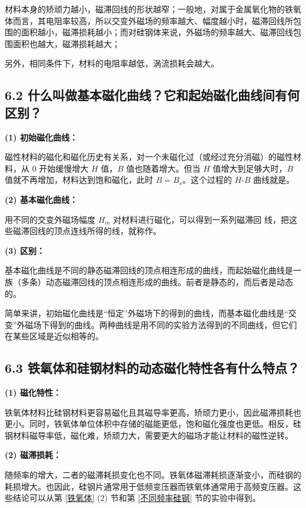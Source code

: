 \documentclass[UTF8]{article}
\theoremstyle{MyLineTheoremStyle} %
\theoremstyle{MyBlockTheoremStyle} %
\theoremstyle{MySubsubsectionStyle} %
\begin{document}
材料本身的矫顽力越小，磁滞回线的形状越窄；一般地，对属于金属氧化物的铁氧体而言，其电阻率较高，所以交变外磁场的频率越大、幅度越小时，磁滞回线所包围的面积越小，磁滞损耗越小；而对硅钢体来说，外磁场的频率越大、磁滞回线包围面积也越大，磁滞损耗越大；

另外，相同条件下，材料的电阻率越低，涡流损耗会越大。


\subsection*{6.2 什么叫做基本磁化曲线？它和起始磁化曲线间有何区别？}

\noindent\textbf{(1) 初始磁化曲线：}

磁性材料的磁化和磁化历史有关系，对一个未磁化过（或经过充分消磁）的磁性材料，从 0 开始缓慢增大 $H$ 值，$B$ 值也随着增大。但当 $H$ 值增大到足够大时，$B$ 值就不再增加，材料达到饱和磁化，此时 $B = B_s$。这个过程的 $H$-$B$ 曲线就是。

\noindent\textbf{(2) 基本磁化曲线：}

用不同的交变外磁场幅度 $H_m$ 对材料进行磁化，可以得到一系列磁滞回
线，把这些磁滞回线的顶点连线所得的线，就称作。

\noindent\textbf{(3) 区别：}

基本磁化曲线是不同的静态磁滞回线的顶点相连形成的曲线，而起始磁化曲线是一族（多条）动态磁滞回线的顶点相连形成的曲线。前者是静态的，而后者是动态的。

简单来讲，初始磁化曲线是“恒定”外磁场下的得到的曲线，而基本磁化曲线是“交变”外磁场下得到的曲线。两种曲线是用不同的实验方法得到的不同曲线，但它们在某些区域是近似相等的。


\subsection*{6.3 铁氧体和硅钢材料的动态磁化特性各有什么特点？}

\noindent\textbf{(1) 磁化特性：}

铁氧体材料比硅钢材料更容易磁化且其磁导率更高，矫顽力更小，因此磁滞损耗也更小。同时，铁氧体单位体积中存储的磁能更低，饱和磁化强度也更低。相反，硅钢材料磁导率低，磁化难，矫顽力大，需要更大的磁场才能让材料的磁性逆转。

\noindent\textbf{(2) 磁滞损耗：}

随频率的增大，二者的磁滞耗损变化也不同。铁氧体磁滞耗损逐渐变小，而硅钢的耗损增大。也因此，硅钢片通常用于低频变压器而铁氧体通常用于高频变压器。这些结论可以从第 \ref{铁氧体} (2) 节和第 \ref{不同频率硅钢} 节的实验中得到。
\end{document}
